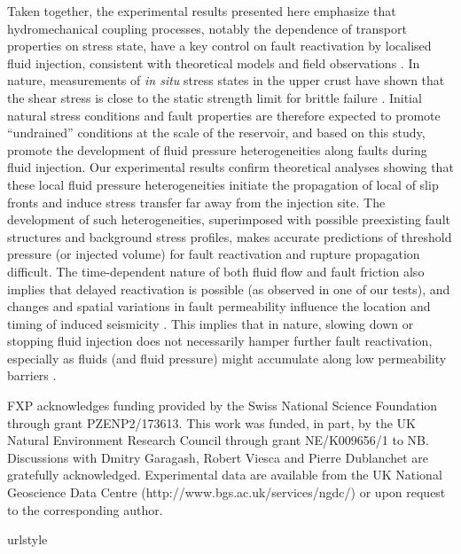 \documentclass[grl]{agutex2arxiv}
\begin{document}
\begin{article}
Taken together, the experimental results presented here emphasize that hydromechanical coupling processes, notably the dependence of transport properties on stress state, have a key control on fault reactivation by localised fluid injection, consistent with theoretical models \citep[e.g.,][]{Cappa2011} and field observations \citep[e.g.,][]{Guglielmi2015}. In nature, measurements of \textit{in situ} stress states in the upper crust have shown that the shear stress is close to the static strength limit for brittle failure \citep[e.g.,][]{Townend2000}. Initial natural stress conditions and fault properties are therefore expected to promote ``undrained'' conditions at the scale of the reservoir, and based on this study, promote the development of fluid pressure heterogeneities along faults during fluid injection. Our experimental results confirm theoretical analyses \citep[e.g.,][]{Garagash2012,Dublanchet2017} showing that these local fluid pressure heterogeneities initiate the propagation of local of slip fronts and induce stress transfer far away from the injection site. The development of such heterogeneities, superimposed with possible preexisting fault structures and background stress profiles, makes accurate predictions of threshold pressure (or injected volume) for fault reactivation and rupture propagation difficult. The time-dependent nature of both fluid flow and fault friction also implies that delayed reactivation is possible (as observed in one of our tests), and changes and spatial variations in fault permeability influence the location and timing of induced seismicity \citep[e.g.,][]{Yeck2016,Chang2016,Vlcek2018}. This implies that in nature, slowing down or stopping fluid injection does not necessarily hamper further fault reactivation, especially as fluids (and fluid pressure) might accumulate along low permeability barriers \citep[e.g.,][]{Yang2017,Passelegue2014}.
 

\begin{acknowledgments}
FXP acknowledges funding provided by the Swiss National Science Foundation through grant PZENP2/173613. This work was funded, in part, by the UK Natural Environment Research Council through grant NE/K009656/1 to NB. Discussions with Dmitry Garagash, Robert Viesca and Pierre Dublanchet are gratefully acknowledged. Experimental data are available from the UK National Geoscience Data Centre (http://www.bgs.ac.uk/services/ngdc/) or upon request to the corresponding author.
\end{acknowledgments}

\begin{thebibliography}{44}
\providecommand{\natexlab}[1]{#1}
\expandafter\ifx\csname urlstyle\endcsname\relax
  \providecommand{\doi}[1]{doi:\discretionary{}{}{}#1}\else
  \providecommand{\doi}{doi:\discretionary{}{}{}\begingroup
  \urlstyle{rm}\Url}\fi


\end{thebibliography}
\end{article}
\end{document}
